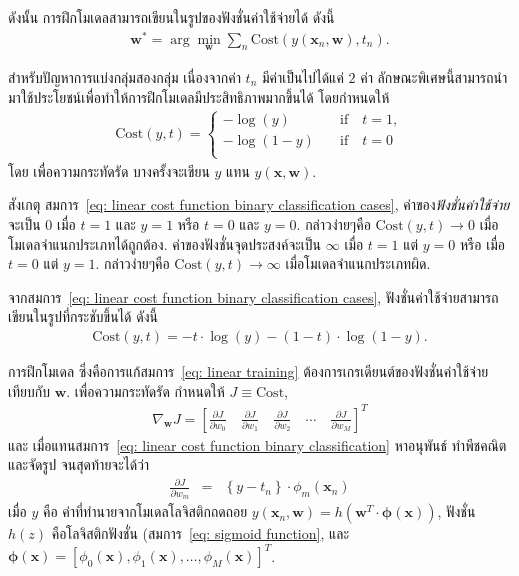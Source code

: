 ดังนั้น การฝึกโมเดลสามารถเขียนในรูปของฟังชั่นค่าใช้จ่ายได้ ดังนี้
\begin{eqnarray}
   \mathbf{w}^* = \arg \min_{\mathbf{w}} \sum_n \mathrm{Cost}( y(\mathbf{x}_n, \mathbf{w}), t_n).
\label{eq: linear training}
\end{eqnarray}

สำหรับปัญหาการแบ่งกลุ่มสองกลุ่ม เนื่องจากค่า $t_n$ มีค่าเป็นไปได้แค่ $2$ ค่า 
ลักษณะพิเศษนี้สามารถนำมาใช้ประโยชน์เพื่อทำให้การฝึกโมเดลมีประสิทธิภาพมากขึ้นได้ 
โดยกำหนดให้
\begin{eqnarray}
   \mathrm{Cost}( y, t) = \left\{ \begin{array}{ll}
 -\log(y) & \quad \mbox{if} \quad t = 1, \\
 -\log(1-y) & \quad \text{if} \quad t = 0 \\
\end{array} \right.
\label{eq: linear cost function binary classification cases}
\end{eqnarray}
โดย เพื่อความกระทัดรัด บางครั้งจะเขียน $y$ แทน $y(\mathbf{x}, \mathbf{w})$.

สังเกตุ สมการ~\ref{eq: linear cost function binary classification cases},  
ค่าของ\textit{ฟังชั่นค่าใช้จ่าย}จะเป็น $0$ เมื่อ $t=1$ และ $y=1$ 
หรือ $t=0$ และ $y=0$. 
กล่าวง่ายๆคือ $\mathrm{Cost}( y, t) \to 0$ เมื่อโมเดลจำแนกประเภทได้ถูกต้อง.
%
ค่าของฟังชั่นจุดประสงค์จะเป็น $\infty$ เมื่อ $t = 1$ แต่ $y = 0$ 
หรือ เมื่อ $t = 0$ แต่ $y = 1$.
กล่าวง่ายๆคือ $\mathrm{Cost}( y, t) \to \infty$ เมื่อโมเดลจำแนกประเภทผิด.

จากสมการ~\ref{eq: linear cost function binary classification cases}, 
ฟังชั่นค่าใช้จ่ายสามารถเขียนในรูปที่กระชับขึ้นได้ ดังนี้
%
\begin{eqnarray}
   \mathrm{Cost}(y,t) = - t \cdot \log(y) - (1 - t) \cdot \log(1 - y).
\label{eq: linear cost function binary classification}
\end{eqnarray}

การฝึกโมเดล ซึ่งคือการแก้สมการ~\ref{eq: linear training} ต้องการเกรเดียนต์ของฟังชั่นค่าใช้จ่ายเทียบกับ $\mathbf{w}$.
เพื่อความกระทัดรัด กำหนดให้ $J \equiv \mathrm{Cost}$,
\begin{eqnarray}
   \nabla_{\mathbf{w}} J = \left[\frac{\partial J}{\partial w_0} \quad \frac{\partial J}{\partial w_1} \quad \frac{\partial J}{\partial w_2} \quad \cdots \quad \frac{\partial J}{\partial w_M}\right]^T
\label{eq: linear gradient cost function binary classification}
\end{eqnarray}
และ เมื่อแทนสมการ~\ref{eq: linear cost function binary classification} 
หาอนุพันธ์ ทำพีชคณิตและจัดรูป จนสุดท้ายจะได้ว่า
\begin{eqnarray}
   \frac{\partial J}{\partial w_m} &=& \left\{ y - t_n \right\} \cdot \phi_m(\mathbf{x}_n)
\label{eq: linear gradient J}
\end{eqnarray}
เมื่อ $y$ คือ ค่าที่ทำนายจากโมเดลโลจิสติกถดถอย $y(\mathbf{x}_n, \mathbf{w}) = h( \mathbf{w}^T \cdot \bm{\phi}(\mathbf{x}) )$,
ฟังชั่น $h(z)$ คือโลจิสติกฟังชั่น (สมการ~\ref{eq: sigmoid function},
และ $\bm{\phi}(\mathbf{x}) = 
[\phi_0(\mathbf{x}), 
\phi_1(\mathbf{x}),
\ldots ,
\phi_M(\mathbf{x})]^T$.

